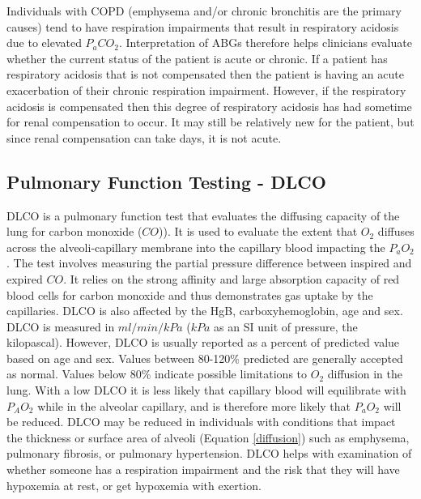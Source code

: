 Individuals with COPD (emphysema and/or chronic bronchitis are the primary causes) tend to have respiration impairments that result in respiratory acidosis due to elevated $P_aCO_2$. Interpretation of ABGs therefore helps clinicians evaluate whether the current status of the patient is acute or chronic. If a patient has respiratory acidosis that is not compensated then the patient is having an acute exacerbation of their chronic respiration impairment. However, if the respiratory acidosis is compensated then this degree of respiratory acidosis has had sometime for renal compensation to occur. It may still be relatively new for the patient, but since renal compensation can take days, it is not acute.\footnotemark{}

\subsection{Pulmonary Function Testing - DLCO}
DLCO is a pulmonary function test that evaluates the diffusing capacity of the lung for carbon monoxide ($CO$)). It is used to evaluate the extent that $O_2$ diffuses across the alveoli-capillary membrane into the capillary blood impacting the $P_aO_2$. The test involves measuring the partial pressure difference between inspired and expired $CO$. It relies on the strong affinity and large absorption capacity of red blood cells for carbon monoxide and thus demonstrates gas uptake by the capillaries. DLCO is also affected by the HgB, carboxyhemoglobin, age and sex. DLCO is measured in $ml/min/kPa$ ($kPa$ as an SI unit of pressure, the kilopascal). However, DLCO is usually reported as a percent of predicted value based on age and sex. Values between 80-120\% predicted are generally accepted as normal. Values below 80\% indicate possible limitations to $O_2$ diffusion in the lung. With a low DLCO it is less likely that capillary blood will equilibrate with $P_AO_2$ while in the alveolar capillary, and is therefore more likely that $P_aO_2$ will be reduced.
DLCO may be reduced in individuals with conditions that impact the thickness or surface area of alveoli (Equation \ref{diffusion}) such as emphysema, pulmonary fibrosis, or pulmonary hypertension.
DLCO helps with examination of whether someone has a respiration impairment and the risk that they will have hypoxemia at rest, or get hypoxemia with exertion.


